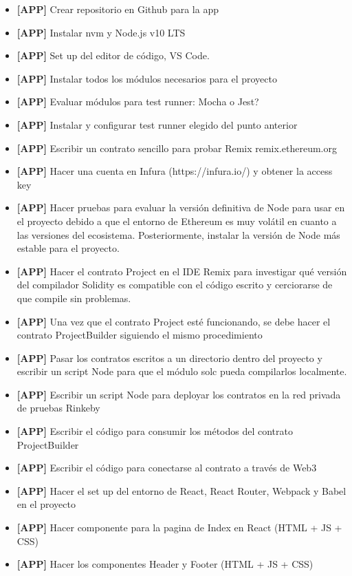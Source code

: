 \begin{itemize}
\item \textbf{[APP]} Crear repositorio en Github para la app
\item \textbf{[APP]} Instalar nvm y Node.js v10 LTS
\item \textbf{[APP]} Set up del editor de código, VS Code.
\item \textbf{[APP]} Instalar todos los módulos necesarios para el proyecto
\item \textbf{[APP]} Evaluar módulos para test runner: Mocha o Jest?
\item \textbf{[APP]} Instalar y configurar test runner elegido del punto anterior
\item \textbf{[APP]} Escribir un contrato sencillo para probar Remix remix.ethereum.org
\item \textbf{[APP]} Hacer una cuenta en Infura (https://infura.io/) y obtener la access key
\item \textbf{[APP]} Hacer pruebas para evaluar la versión definitiva de Node para usar en el
proyecto debido a que el entorno de Ethereum es muy volátil en cuanto a las versiones del
ecosistema. Posteriormente, instalar la versión de Node más estable para el proyecto.
\item \textbf{[APP]} Hacer el contrato Project en el IDE Remix para investigar qué versión del
compilador Solidity es compatible con el código escrito y cerciorarse de que compile sin problemas.
\item \textbf{[APP]} Una vez que el contrato Project esté funcionando, se debe hacer el contrato
ProjectBuilder siguiendo el mismo procedimiento
\item \textbf{[APP]} Pasar los contratos escritos a un directorio dentro del proyecto y escribir
un script Node para que el módulo solc pueda compilarlos localmente.
\item \textbf{[APP]} Escribir un script Node para deployar los contratos en la red privada de 
pruebas Rinkeby
\item \textbf{[APP]} Escribir el código para consumir los métodos del contrato ProjectBuilder
\item \textbf{[APP]} Escribir el código para conectarse al contrato a través de Web3
\item \textbf{[APP]} Hacer el set up del entorno de React, React Router, Webpack y Babel en el
proyecto
\item \textbf{[APP]} Hacer componente para la pagina de Index en React (HTML + JS + CSS)
\item \textbf{[APP]} Hacer los componentes Header y Footer (HTML + JS + CSS)

\end{itemize}
